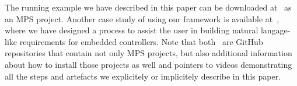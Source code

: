 The running example we have described in this paper can be downloaded
at~\cite{coolingControllerProcess} as an MPS project. Another case study of
using our framework is available at~\cite{earsctrlProcess}, where we have
designed a process to assist the user in building natural langage-like
requirements for embedded controllers. Note that
both~\cite{coolingControllerProcess,earsctrlProcess} are GitHub repositories
that contain not only MPS projects, but also additional information about how to
install those projects as well and pointers to videos demonstrating all the
steps and artefacts we explicitely or implicitely describe in this paper.
 \vspace{-.6cm}
  




